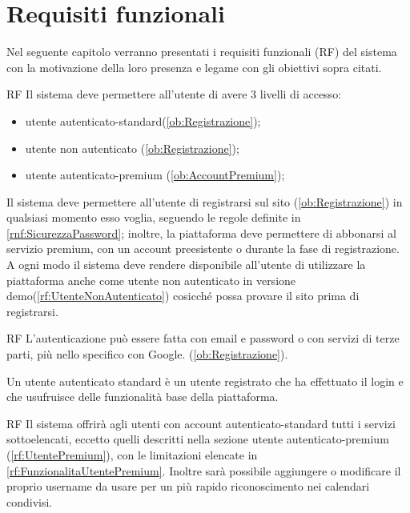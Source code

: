 \section{Requisiti funzionali}
\label{sec:RequisitiFunzionali}

Nel seguente capitolo verranno presentati i requisiti funzionali (RF) del sistema con la motivazione della loro presenza e legame con gli obiettivi sopra citati.

\begin{listaPersonale}{RF}
	 Il sistema deve permettere all'utente di avere 3 livelli di accesso:
	\begin{itemize}
		\item utente autenticato-standard(\ref{ob:Registrazione});
		\item utente non autenticato (\ref{ob:Registrazione});
		\item utente autenticato-premium (\ref{ob:AccountPremium});
	\end{itemize}
Il sistema deve permettere all'utente di registrarsi sul sito (\ref{ob:Registrazione}) in qualsiasi momento esso voglia, seguendo le regole definite in \ref{rnf:SicurezzaPassword}; inoltre, la piattaforma deve permettere di abbonarsi al servizio premium, con un account preesistente o durante la fase di registrazione.\\
	A ogni modo il sistema deve rendere disponibile all'utente di utilizzare la piattaforma anche come utente non autenticato in versione demo(\ref{rf:UtenteNonAutenticato}) cosicché possa provare il sito prima di registrarsi.

	\begin{listaPersonale2}{RF}
		 L'autenticazione può essere fatta con email e password o con servizi di terze parti, più nello specifico con Google. (\ref{ob:Registrazione}).
	\end{listaPersonale2}

	 Un utente autenticato standard è un utente registrato che ha effettuato il login e che usufruisce delle funzionalità base della piattaforma.

	\begin{listaPersonale2}{RF}
		 Il sistema offrirà agli utenti con account autenticato-standard tutti i servizi sottoelencati, eccetto quelli descritti nella sezione utente autenticato-premium (\ref{rf:UtentePremium}), con le limitazioni elencate in \ref{rf:FunzionalitaUtentePremium}. Inoltre sarà possibile aggiungere o modificare il proprio username da usare per un più rapido riconoscimento nei calendari condivisi.


\end{listaPersonale2}
\end{listaPersonale}
